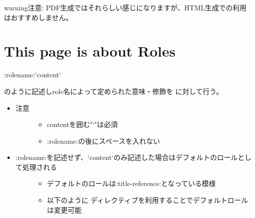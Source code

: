 \documentclass[letterpaper,10pt,dvipdfmx,openany,oneside]{sphinxmanual}
\begin{document}
\begin{sphinxadmonition}{warning}{注意:}
PDF生成ではそれらしい感じになりますが、HTML生成での利用はおすすめしません。
\end{sphinxadmonition}


\chapter{This page is about Roles}
\label{\detokenize{1.chapter/roles:sample-target}}\label{\detokenize{1.chapter/roles:this-page-is-about-roles}}\label{\detokenize{1.chapter/roles::doc}}
%
\begin{sphinxVerbatim}[commandchars=\\\{\}]
:rolename:{}`content{}`
\end{sphinxVerbatim}

のように記述しrole名によって定められた意味・修飾を  に対して行う。
\begin{itemize}
\item {} \begin{description}
\item[{注意}] \leavevmode\begin{itemize}
\item {} 
contentを囲む"{}`"は必須

\item {} 
:rolename:の後にスペースを入れない

\end{itemize}

\end{description}

\item {} \begin{description}
\item[{:rolename:を記述せず、{}`content{}`のみ記述した場合はデフォルトのロールとして処理される}] \leavevmode\begin{itemize}
\item {} 
デフォルトのロールは:title-reference:となっている模様

\item {} 
以下のように  ディレクティブを利用することでデフォルトロールは変更可能

\end{itemize}

\end{description}

\end{itemize}
\end{document}
